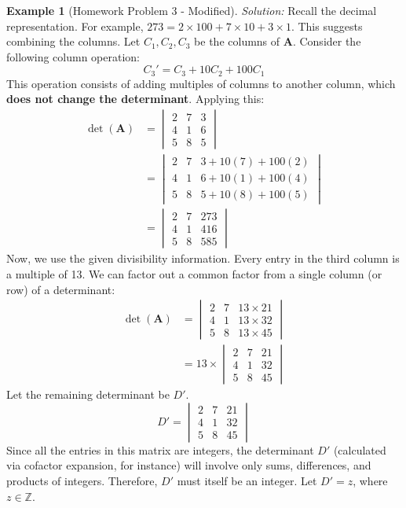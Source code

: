 \documentclass[11pt]{article}
\theoremstyle{definition}
\newtheorem{example}[theorem]{Example}
\theoremstyle{remark}
\newcommand{\field}[1]{\mathbb{#1}} %
\newcommand{\Z}{\field{Z}} %
\newcommand{\mat}[1]{\mathbf{#1}} %
\begin{document}
\begin{example}[Homework Problem 3 - Modified]
\textit{Solution:}
Recall the decimal representation. For example, $273 = 2 \times 100 + 7 \times 10 + 3 \times 1$. This suggests combining the columns. Let $C_1, C_2, C_3$ be the columns of $\mat{A}$. Consider the following column operation:
\[ C_3' = C_3 + 10 C_2 + 100 C_1 \]
This operation consists of adding multiples of columns to another column, which \textbf{does not change the determinant}. Applying this:
\begin{align*} \det(\mat{A}) &= \begin{vmatrix} 2 & 7 & 3 \\ 4 & 1 & 6 \\ 5 & 8 & 5 \end{vmatrix} \\ &= \begin{vmatrix} 2 & 7 & 3 + 10(7) + 100(2) \\ 4 & 1 & 6 + 10(1) + 100(4) \\ 5 & 8 & 5 + 10(8) + 100(5) \end{vmatrix} \\ &= \begin{vmatrix} 2 & 7 & 273 \\ 4 & 1 & 416 \\ 5 & 8 & 585 \end{vmatrix} \end{align*}
Now, we use the given divisibility information. Every entry in the third column is a multiple of 13. We can factor out a common factor from a single column (or row) of a determinant:
\begin{align*} \det(\mat{A}) &= \begin{vmatrix} 2 & 7 & 13 \times 21 \\ 4 & 1 & 13 \times 32 \\ 5 & 8 & 13 \times 45 \end{vmatrix} \\ &= 13 \times \begin{vmatrix} 2 & 7 & 21 \\ 4 & 1 & 32 \\ 5 & 8 & 45 \end{vmatrix} \end{align*}
Let the remaining determinant be $D'$.
\[ D' = \begin{vmatrix} 2 & 7 & 21 \\ 4 & 1 & 32 \\ 5 & 8 & 45 \end{vmatrix} \]
Since all the entries in this matrix are integers, the determinant $D'$ (calculated via cofactor expansion, for instance) will involve only sums, differences, and products of integers. Therefore, $D'$ must itself be an integer. Let $D' = z$, where $z \in \Z$.


\end{example}
\end{document}
